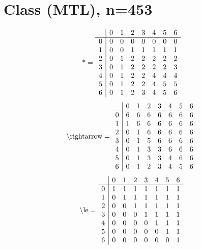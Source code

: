 \documentclass[11pt]{article}
\begin{document}
\section{Class (MTL), n=453}
\[\text{*} = 
\begin{array}{r | r r r r r r r}
 & 0 & 1 & 2 & 3 & 4 & 5 & 6 \\ \hline
0 & 0 & 0 & 0 & 0 & 0 & 0 & 0 \\
1 & 0 & 0 & 1 & 1 & 1 & 1 & 1 \\
2 & 0 & 1 & 2 & 2 & 2 & 2 & 2 \\
3 & 0 & 1 & 2 & 2 & 2 & 2 & 3 \\
4 & 0 & 1 & 2 & 2 & 4 & 4 & 4 \\
5 & 0 & 1 & 2 & 2 & 4 & 5 & 5 \\
6 & 0 & 1 & 2 & 3 & 4 & 5 & 6 \\
\end{array}
\]
\[\text{\textbackslash rightarrow} = 
\begin{array}{r | r r r r r r r}
 & 0 & 1 & 2 & 3 & 4 & 5 & 6 \\ \hline
0 & 6 & 6 & 6 & 6 & 6 & 6 & 6 \\
1 & 1 & 6 & 6 & 6 & 6 & 6 & 6 \\
2 & 0 & 1 & 6 & 6 & 6 & 6 & 6 \\
3 & 0 & 1 & 5 & 6 & 6 & 6 & 6 \\
4 & 0 & 1 & 3 & 3 & 6 & 6 & 6 \\
5 & 0 & 1 & 3 & 3 & 4 & 6 & 6 \\
6 & 0 & 1 & 2 & 3 & 4 & 5 & 6 \\
\end{array}
\]
\[\text{\textbackslash le} = 
\begin{array}{r | r r r r r r r}
 & 0 & 1 & 2 & 3 & 4 & 5 & 6 \\ \hline
0 & 1 & 1 & 1 & 1 & 1 & 1 & 1 \\
1 & 0 & 1 & 1 & 1 & 1 & 1 & 1 \\
2 & 0 & 0 & 1 & 1 & 1 & 1 & 1 \\
3 & 0 & 0 & 0 & 1 & 1 & 1 & 1 \\
4 & 0 & 0 & 0 & 0 & 1 & 1 & 1 \\
5 & 0 & 0 & 0 & 0 & 0 & 1 & 1 \\
6 & 0 & 0 & 0 & 0 & 0 & 0 & 1 \\
\end{array}
\]
\end{document}
